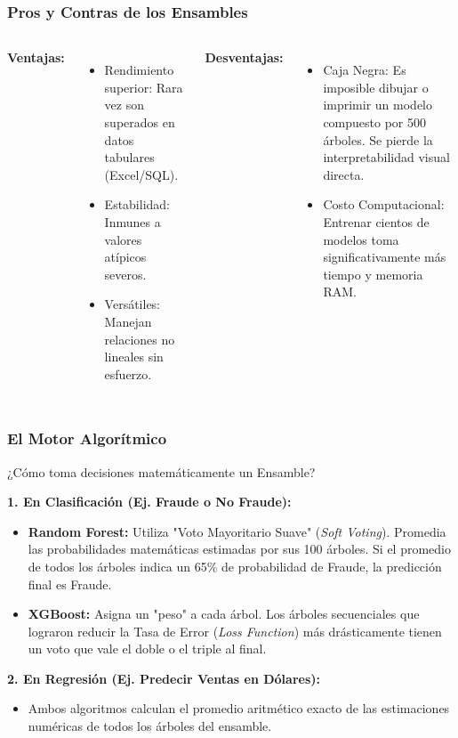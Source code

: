 \documentclass{beamer}
\begin{document}
\begin{frame}
\frametitle{Pros y Contras de los Ensambles}
\begin{columns}
\textbf{Ventajas:}
\begin{itemize}
    \item \textcolor{green!70!black}{Rendimiento superior:} Rara vez son superados en datos tabulares (Excel/SQL).
    \item \textcolor{green!70!black}{Estabilidad:} Inmunes a valores atípicos severos.
    \item \textcolor{green!70!black}{Versátiles:} Manejan relaciones no lineales sin esfuerzo.
\end{itemize}

\textbf{Desventajas:}
\begin{itemize}
    \item \textcolor{red!70!black}{Caja Negra:} Es imposible dibujar o imprimir un modelo compuesto por 500 árboles. Se pierde la interpretabilidad visual directa.
    \item \textcolor{red!70!black}{Costo Computacional:} Entrenar cientos de modelos toma significativamente más tiempo y memoria RAM.
\end{itemize}
\end{columns}
\end{frame}

\begin{frame}
\frametitle{El Motor Algorítmico}
¿Cómo toma decisiones matemáticamente un Ensamble?

\vspace{0.3cm}
\textbf{1. En Clasificación (Ej. Fraude o No Fraude):}
\begin{itemize}
    \item \textbf{Random Forest:} Utiliza "Voto Mayoritario Suave" (\textit{Soft Voting}). Promedia las probabilidades matemáticas estimadas por sus 100 árboles. Si el promedio de todos los árboles indica un 65\% de probabilidad de Fraude, la predicción final es Fraude.
    \item \textbf{XGBoost:} Asigna un "peso" a cada árbol. Los árboles secuenciales que lograron reducir la Tasa de Error (\textit{Loss Function}) más drásticamente tienen un voto que vale el doble o el triple al final.
\end{itemize}

\vspace{0.3cm}
\textbf{2. En Regresión (Ej. Predecir Ventas en Dólares):}
\begin{itemize}
    \item Ambos algoritmos calculan el promedio aritmético exacto de las estimaciones numéricas de todos los árboles del ensamble.
\end{itemize}
\end{frame}
\end{document}
